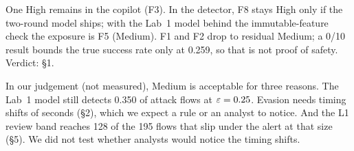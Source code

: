  One High remains in the copilot (F3). In the detector, F8 stays High only if the two-round model ships; with the Lab~1 model behind the immutable-feature check the exposure is F5 (Medium). F1 and F2 drop to residual Medium; a 0/10 result bounds the true success rate only at 0.259, so that is not proof of safety. Verdict: \S1.

 In our judgement (not measured), Medium is acceptable for three reasons. The Lab~1 model still detects 0.350 of attack flows at $\varepsilon=0.25$. Evasion needs timing shifts of seconds (\S2), which we expect a rule or an analyst to notice. And the L1 review band reaches 128 of the 195 flows that slip under the alert at that size (\S5). We did not test whether analysts would notice the timing shifts.
